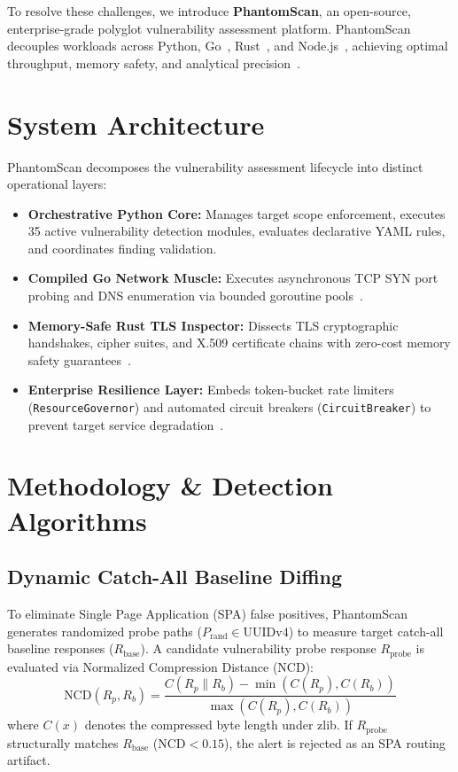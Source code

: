 \documentclass[conference]{IEEEtran}
\begin{document}
To resolve these challenges, we introduce \textbf{PhantomScan}, an open-source, enterprise-grade polyglot vulnerability assessment platform. PhantomScan decouples workloads across Python, Go~\cite{durumeric2013zmap}, Rust~\cite{jung2018rustbelt}, and Node.js~\cite{stock2014domxss}, achieving optimal throughput, memory safety, and analytical precision~\cite{mayer2015polyglot}.

\section{System Architecture}
PhantomScan decomposes the vulnerability assessment lifecycle into distinct operational layers:
\begin{itemize}
    \item \textbf{Orchestrative Python Core:} Manages target scope enforcement, executes 35 active vulnerability detection modules, evaluates declarative YAML rules, and coordinates finding validation.
    \item \textbf{Compiled Go Network Muscle:} Executes asynchronous TCP SYN port probing and DNS enumeration via bounded goroutine pools~\cite{tu2019gobugs}.
    \item \textbf{Memory-Safe Rust TLS Inspector:} Dissects TLS cryptographic handshakes, cipher suites, and X.509 certificate chains with zero-cost memory safety guarantees~\cite{jung2018rustbelt, holz2011ssl}.
    \item \textbf{Enterprise Resilience Layer:} Embeds token-bucket rate limiters (\texttt{ResourceGovernor}) and automated circuit breakers (\texttt{CircuitBreaker}) to prevent target service degradation~\cite{staniford2002portscan}.
\end{itemize}

\section{Methodology \& Detection Algorithms}

\subsection{Dynamic Catch-All Baseline Diffing}
To eliminate Single Page Application (SPA) false positives, PhantomScan generates randomized probe paths ($P_{\text{rand}} \in \text{UUIDv4}$) to measure target catch-all baseline responses ($R_{\text{base}}$). A candidate vulnerability probe response $R_{\text{probe}}$ is evaluated via Normalized Compression Distance (NCD):
\begin{equation}
\text{NCD}(R_p, R_b) = \frac{C(R_p \parallel R_b) - \min(C(R_p), C(R_b))}{\max(C(R_p), C(R_b))}
\end{equation}
where $C(x)$ denotes the compressed byte length under zlib. If $R_{\text{probe}}$ structurally matches $R_{\text{base}}$ ($\text{NCD} < 0.15$), the alert is rejected as an SPA routing artifact.
\end{document}
